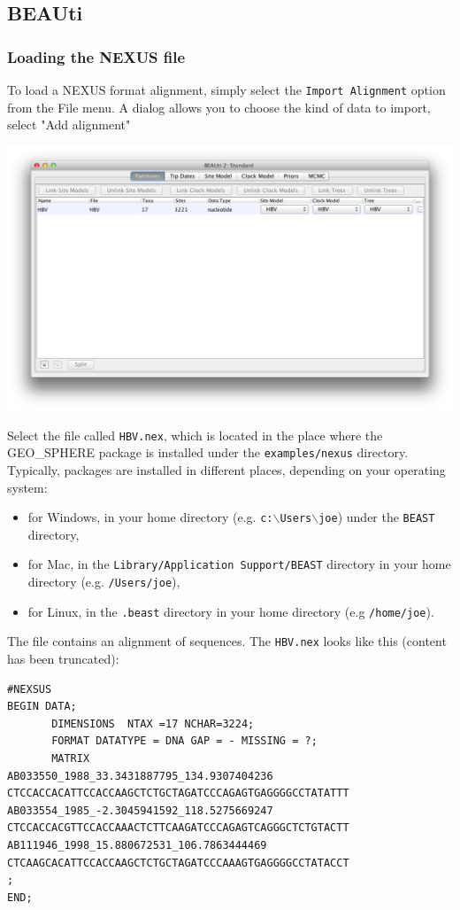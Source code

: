 \documentclass{article}
\def\beast-geo{GEO\_SPHERE}
\begin{document}
\subsection*{BEAUti}


\subsubsection*{Loading the NEXUS file }

To load a NEXUS format alignment, simply select the \texttt{Import Alignment} option from the File menu. A dialog allows you to choose the kind of data to import, select "Add alignment"

\includegraphics[scale=0.4]{figures/BEAUti_DataPartitions}

Select the file called \texttt{HBV.nex}, which is located in the place where the \beast-geo{} package is installed 
under the {\tt examples/nexus} directory. Typically, packages are installed in different places, depending on your operating system:
\begin{itemize}
\item for Windows, in your home directory (e.g. {\tt c:$\backslash$Users$\backslash$joe}) under the {\tt BEAST} directory,
\item for Mac, in the {\tt Library/Application Support/BEAST} directory in your home directory (e.g. {\tt /Users/joe}),
\item for Linux, in the {\tt .beast} directory in your home directory (e.g {\tt /home/joe}).
\end{itemize}
The file contains an alignment of sequences. The \texttt{HBV.nex} looks like this (content has been truncated):

\begin{verbatim}
#NEXSUS
BEGIN DATA;
       DIMENSIONS  NTAX =17 NCHAR=3224;
       FORMAT DATATYPE = DNA GAP = - MISSING = ?;
       MATRIX   
AB033550_1988_33.3431887795_134.9307404236		CTCCACCACATTCCACCAAGCTCTGCTAGATCCCAGAGTGAGGGGCCTATATTT
AB033554_1985_-2.3045941592_118.5275669247		CTCCACCACGTTCCACCAAACTCTTCAAGATCCCAGAGTCAGGGCTCTGTACTT
AB111946_1998_15.880672531_106.7863444469		CTCAAGCACATTCCACCAAGCTCTGCTAGATCCCAAAGTGAGGGGCCTATACCT
;
END;
\end{verbatim}
\end{document}
